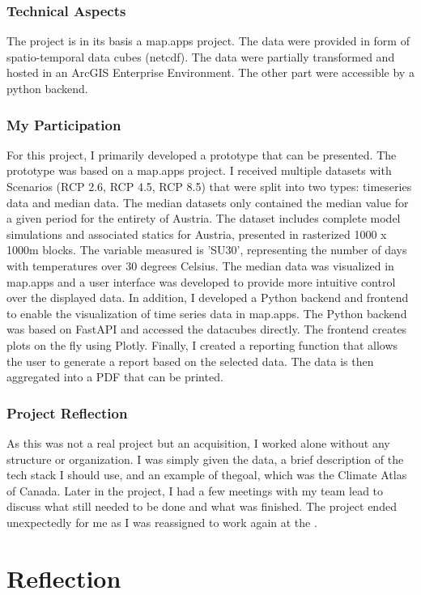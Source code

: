 \documentclass[11pt, titlepage, a4paper]{article}
\begin{document}
\subsubsection{Technical Aspects}
The project is in its basis a map.apps project. The data were provided in form of spatio-temporal data cubes (netcdf). The data were partially transformed and hosted in an ArcGIS Enterprise Environment. The other part were accessible by a python backend.
\subsubsection{My Participation}
For this project, I primarily developed a prototype that can be presented. The prototype was based on a map.apps project.    I received multiple datasets with  Scenarios (RCP 2.6, RCP 4.5, RCP 8.5) that were split into two types: timeseries data and median data. The median datasets only contained the median value for a given period for the entirety of Austria. The dataset includes complete model simulations and associated statics for Austria, presented in rasterized 1000 x 1000m blocks. The variable measured is 'SU30', representing the number of days with temperatures over 30 degrees Celsius.
The median data was visualized in map.apps and a user interface was developed to provide more intuitive control over the displayed data. In addition, I developed a Python backend and frontend to enable the visualization of time series data in map.apps. The Python backend was based on FastAPI and accessed the datacubes directly. The frontend creates plots on the fly using Plotly. Finally, I created a reporting function that allows the user to generate a report based on the selected data. The data is then aggregated into a PDF that can be printed.

\subsubsection{Project Reflection}
As this was not a real project but an acquisition, I worked alone without any structure or organization.  I was simply given the data, a brief description of the tech stack I should use, and an example of thegoal, which was the Climate Atlas of Canada. Later in the project, I had a few meetings with my team lead to discuss what still needed to be done and what was finished. The project ended unexpectedly for me as I was reassigned to work again at the .
\section{Reflection}
\end{document}

